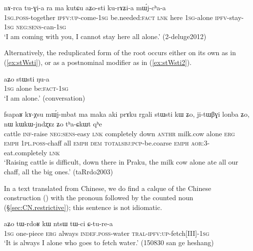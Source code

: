 \begin{exe}
	\ex \label{ex:aZosti}
	\gll   nɤ-rca tu-ɣi-a ra ma kutɕu aʑo-sti ku-rɤʑi-a mɯ́j-cʰa-a \\
	\textsc{1sg}.\textsc{poss}-together \textsc{ipfv}:\textsc{up}-come-\textsc{1sg} be.needed:\textsc{fact} \textsc{lnk} here \textsc{1sg}-alone \textsc{ipfv}-stay-\textsc{1sg} \textsc{neg}:\textsc{sens}-can-\textsc{1sg} \\
	\glt `I am coming with you, I cannot stay here all alone.' (2-deluge2012)
\end{exe}

Alternatively, the reduplicated form of the root  occurs either on its own as in (\ref{ex:stWsti}), or as a postnominal modifier as in (\ref{ex:stWsti2}).

\begin{exe}
	\ex \label{ex:stWsti}
	\gll aʑo stɯsti ŋu-a \\
	\textsc{1sg} alone be:\textsc{fact}-\textsc{1sg} \\
	\glt `I am alone.' (conversation)
\end{exe}

\begin{exe}
	\ex \label{ex:stWsti2}
	\gll  fsapaʁ kɤ-χsu mɯ́j-mbat ma maka aki prɤku rgali stɯsti kɯ ʑo, ji-tɯβɣi lonba ʑo, nɯ kɯ\redp{}kɯ-jndʐɤz ʑo tʰa-ɕkɯt qʰe \\
	cattle \textsc{inf}-raise \textsc{neg}:\textsc{sens}-easy \textsc{lnk} completely down  \textsc{anthr} milk.cow alone \textsc{erg} \textsc{emph} \textsc{1pl}.\textsc{poss}-chaff all \textsc{emph} \textsc{dem} \textsc{total}\redp{}\textsc{sbj}:\textsc{pcp}-be.coarse \textsc{emph} \textsc{aor}:3\flobv{}-eat.completely \textsc{lnk} \\
	\glt `Raising cattle is difficult, down there in Praku, the milk cow alone ate all our chaff, all the big ones.' (taRrdo2003)
\end{exe}


In a text translated from Chinese, we do find a calque of the Chinese construction () with the pronoun  followed by the counted noun  (§\ref{sec:CN.restrictive}); this sentence is not idiomatic.

\begin{exe}
	\ex \label{ex:aZo.tWrdoR}
	\gll  aʑo tɯ-rdoʁ kɯ ntsɯ tɯ-ci ɕ-tu-re-a \\
	\textsc{1sg} one-piece \textsc{erg} always \textsc{indef}.\textsc{poss}-water \textsc{tral}-\textsc{ipfv}:\textsc{up}-fetch[III]-\textsc{1sg} \\
	\glt `It is always I alone who goes to fetch water.' (150830 san ge heshang)
\end{exe}

